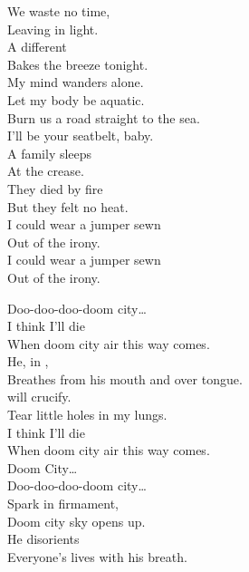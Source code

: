 We waste no time, \\
Leaving in light. \\
A different  \\
Bakes the breeze tonight. \\

My mind wanders alone. \\
Let my body be aquatic. \\

Burn us a road straight to the sea. \\
I'll be your seatbelt, baby. \\

A family sleeps \\
At the crease. \\
They died by fire \\
But they felt no heat. \\
I could wear a jumper sewn \\
Out of the irony. \\

I could wear a jumper sewn \\
Out of the irony. \\





Doo-doo-doo-doom city… \\

I think I'll die \\
When doom city air this way comes. \\
He, in , \\
Breathes from his mouth and over tongue. \\

 will crucify. \\
Tear little holes in my lungs. \\
I think I'll die \\
When doom city air this way comes. \\

Doom City… \\

Doo-doo-doo-doom city… \\

Spark in firmament, \\
Doom city sky opens up. \\
He disorients \\
Everyone's lives with his breath. \\

